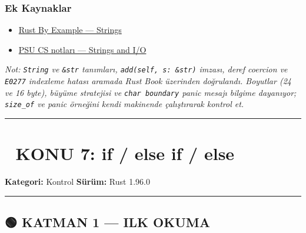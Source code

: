 \documentclass[12pt,a4paper]{article}
\begin{document}
\subsubsection{Ek Kaynaklar}\label{ek-kaynaklar-5}

\begin{itemize}
\tightlist
\item
  \href{https://doc.rust-lang.org/rust-by-example/std/str.html}{Rust By Example --- Strings}
\item
  \href{https://moodle.cs.pdx.edu/mod/page/view.php?id=212}{PSU CS notları --- Strings and I/O}
\end{itemize}

\emph{Not: \texttt{String} ve \texttt{\&str} tanımları, \texttt{add(self,\ s:\ \&str)} imzası, deref coercion ve \texttt{E0277} indexleme hatası aramada Rust Book üzerinden doğrulandı. Boyutlar (24 ve 16 byte), büyüme stratejisi ve \texttt{char\ boundary} panic mesajı bilgime dayanıyor; \texttt{size\_of} ve panic örneğini kendi makinende çalıştırarak kontrol et.}

\begin{center}\rule{0.5\linewidth}{0.5pt}\end{center}

\section{📘 KONU 7: if / else if / else}\label{konu-7-if-else-if-else}

\textbf{Kategori:} Kontrol \textbar{} \textbf{Sürüm:} Rust 1.96.0

\begin{center}\rule{0.5\linewidth}{0.5pt}\end{center}

\subsection{🟢 KATMAN 1 --- ILK OKUMA}\label{katman-1-—-ilk-okuma-6}
\end{document}
